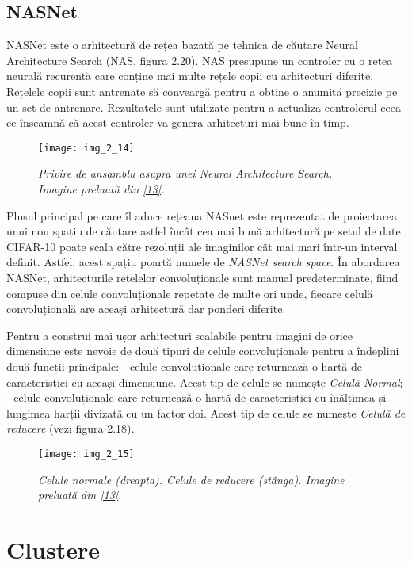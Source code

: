 \subsection{NASNet}
NASNet este o arhitectură de rețea bazată pe tehnica de căutare Neural Architecture Search (NAS, figura 2.20). NAS presupune un controler cu o rețea neurală recurentă care conține mai multe rețele copii cu arhitecturi diferite. Rețelele copii sunt antrenate să conveargă pentru a obține o anumită precizie pe un set de antrenare. Rezultatele sunt utilizate pentru a actualiza controlerul ceea ce înseamnă că acest controler va genera arhitecturi mai bune în timp.
\begin{figure}[!h]
	\centering
	\texttt{[image: img\_2\_14]}
	\caption[NAS]{\textit{Privire de ansamblu asupra unei Neural Architecture Search. Imagine preluată din \hyperlink{Zoph2018LearningTA}{[13]}.}}
\end{figure}  

Plusul principal pe care îl aduce rețeaua NASnet este reprezentat de proiectarea unui nou spațiu de căutare astfel încât cea mai bună arhitectură pe setul de date CIFAR-10 poate scala către rezoluții ale imaginilor cât mai mari într-un interval definit. Astfel, acest spațiu poartă numele de \textit{NASNet search space}. În abordarea NASNet, arhitecturile rețelelor convoluționale sunt manual predeterminate, fiind compuse din celule convoluționale repetate de multe ori unde, fiecare celulă convoluțională are aceași arhitectură dar ponderi diferite.

Pentru a construi mai ușor arhitecturi scalabile pentru imagini de orice dimensiune este nevoie de două tipuri de celule convoluționale pentru a îndeplini două funcții principale: - celule convoluționale care returnează o hartă de caracteristici cu aceași dimensiune. Acest tip de celule se numește \textit{Celulă Normal}; - celule convoluționale care returnează o hartă de caracteristici cu înălțimea și lungimea harții divizată cu un factor doi. Acest tip de celule se numește \textit{Celulă de reducere} (vezi figura 2.18).
\begin{figure}[!h]
	\centering
	\texttt{[image: img\_2\_15]}
	\caption[Celule normale și de reducere]{\textit{Celule normale (dreapta). Celule de reducere (stânga). Imagine preluată din \hyperlink{Zoph2018LearningTA}{[13]}.}}
\end{figure}  

\section{Clustere}

